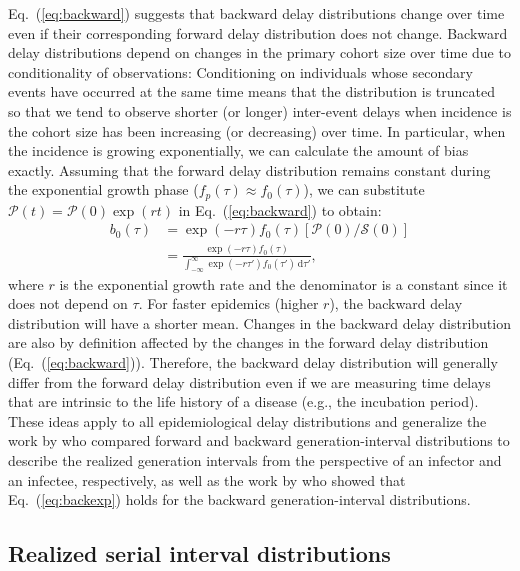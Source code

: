 \documentclass[12pt]{article}
\newcommand{\eref}[1]{Eq.~(\ref{eq:#1})}
\newcommand{\dd}[1]{\ensuremath{\, \mathrm{d}#1}}
\newcommand{\dtau}{\dd{\tau}}
\newcommand{\psize}{{\mathcal P}} %
\newcommand{\ssize}{{\mathcal S}} %
\begin{document}
\eref{backward} suggests that backward delay distributions change over time even if their corresponding forward delay distribution does not change.
Backward delay distributions depend on changes in the primary cohort size over time due to conditionality of observations:
Conditioning on individuals whose secondary events have occurred at the same time means that the distribution is truncated so that we tend to observe shorter (or longer) inter-event delays when incidence is  the cohort size has been increasing (or decreasing) over time.
In particular, when the incidence is growing exponentially, we can calculate the amount of bias exactly.
Assuming that the forward delay distribution remains constant during the exponential growth phase ($f_p(\tau) \approx f_0(\tau)$), we can substitute $\psize(t) = \psize(0) \exp(rt)$ in \eref{backward} to obtain:
\begin{align}
b_0(\tau) &= \exp(-r\tau) f_0(\tau) \left[\psize(0)/\ssize(0)\right]\\
&=\frac{\exp(-r\tau) f_0(\tau)}{\int_{-\infty}^{\infty} \exp(-r\tau') f_0(\tau') \dtau'},
\label{eq:backexp}
\end{align}
where $r$ is the exponential growth rate and the denominator is a constant since it does not depend on $\tau$.
For faster epidemics (higher $r$), the backward delay distribution will have a shorter mean.
Changes in the backward delay distribution are also by definition affected by the changes in the forward delay distribution (\eref{backward}).
Therefore, the backward delay distribution will generally differ from the forward delay distribution even if we are measuring time delays that are intrinsic to the life history of a disease (e.g., the incubation period).
These ideas apply to all epidemiological delay distributions and generalize the work by \cite{champredon2015intrinsic} who compared forward and backward generation-interval distributions to describe the realized generation intervals from the perspective of an infector and an infectee, respectively, as well as the work by \cite{britton2019estimation} who showed that \eref{backexp} holds for the backward generation-interval distributions.

\subsection{Realized serial interval distributions}
\end{document}
